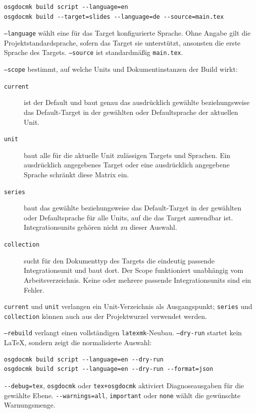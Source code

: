 \documentclass[
load-preamble+
]{osgdoc}
\begin{document}
\begin{verbatim}
osgdocmk build script --language=en
osgdocmk build --target=slides --language=de --source=main.tex
\end{verbatim}

\texttt{--language} wählt eine für das Target konfigurierte Sprache. Ohne
Angabe gilt die Projektstandardsprache, sofern das Target sie unterstützt,
ansonsten die erste Sprache des Targets. \texttt{--source} ist standardmäßig
\texttt{main.tex}.

\texttt{--scope} bestimmt, auf welche Units und Dokumentinstanzen der Build wirkt:

\begin{description}
\item[\texttt{current}] ist der Default und baut genau das ausdrücklich
  gewählte beziehungsweise das Default-Target in der gewählten oder
  Defaultsprache der aktuellen Unit.
\item[\texttt{unit}] baut alle für die aktuelle Unit zulässigen Targets und
  Sprachen. Ein ausdrücklich angegebenes Target oder eine ausdrücklich
  angegebene Sprache schränkt diese Matrix ein.
\item[\texttt{series}] baut das gewählte beziehungsweise das Default-Target in
  der gewählten oder Defaultsprache für alle Units, auf die das Target
  anwendbar ist. Integrationsunits gehören nicht zu dieser Auswahl.
\item[\texttt{collection}] sucht für den Dokumenttyp des Targets die eindeutig
  passende Integrationsunit und baut dort. Der Scope funktioniert unabhängig
  vom Arbeitsverzeichnis. Keine oder mehrere passende Integrationsunits sind
  ein Fehler.
\end{description}

\texttt{current} und \texttt{unit} verlangen ein Unit-Verzeichnis als
Ausgangspunkt; \texttt{series} und \texttt{collection} können auch aus der
Projektwurzel verwendet werden.

\texttt{--rebuild} verlangt einen vollständigen \texttt{latexmk}-Neubau.
\texttt{--dry-run} startet kein LaTeX, sondern zeigt die normalisierte Auswahl:

\begin{verbatim}
osgdocmk build script --language=en --dry-run
osgdocmk build script --language=en --dry-run --format=json
\end{verbatim}

\verb|--debug=tex|, \texttt{osgdocmk} oder \texttt{tex+osgdocmk} aktiviert
Diagnoseausgaben für die gewählte Ebene. \verb|--warnings=all|,
\texttt{important} oder \texttt{none} wählt die gewünschte Warnungsmenge.
\end{document}

